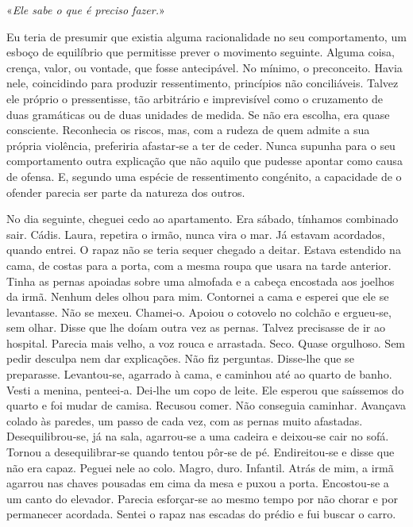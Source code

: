«\emph{Ele sabe o que é preciso fazer.}»

Eu teria de presumir que existia alguma racionalidade no seu
comportamento, um esboço de equilíbrio que permitisse prever o movimento
seguinte. Alguma coisa, crença, valor, ou vontade, que fosse
antecipável. No mínimo, o preconceito. Havia nele, coincidindo para
produzir ressentimento, princípios não conciliáveis. Talvez ele próprio
o pressentisse, tão arbitrário e imprevisível como o cruzamento de duas
gramáticas ou de duas unidades de medida. Se não era escolha, era quase
consciente. Reconhecia os riscos, mas, com a rudeza de quem admite a sua
própria violência, preferiria afastar­‑se a ter de ceder. Nunca supunha
para o seu comportamento outra explicação que não aquilo que pudesse
apontar como causa de ofensa. E, segundo uma espécie de ressentimento
congénito, a capacidade de o ofender parecia ser parte da natureza dos
outros.

No dia seguinte, cheguei cedo ao apartamento. Era sábado, tínhamos
combinado sair. Cádis. Laura, repetira o irmão, nunca vira o mar. Já
estavam acordados, quando entrei. O rapaz não se teria sequer chegado a
deitar. Estava estendido na cama, de costas para a porta, com a mesma
roupa que usara na tarde anterior. Tinha as pernas apoiadas sobre uma
almofada e a cabeça encostada aos joelhos da irmã. Nenhum deles olhou
para mim. Contornei a cama e esperei que ele se levantasse. Não se
mexeu. Chamei­‑o. Apoiou o cotovelo no colchão e ergueu­‑se, sem olhar.
Disse que lhe doíam outra vez as pernas. Talvez precisasse de ir ao
hospital. Parecia mais velho, a voz rouca e arrastada. Seco. Quase
orgulhoso. Sem pedir desculpa nem dar explicações. Não fiz perguntas.
Disse­‑lhe que se preparasse. Levantou­‑se, agarrado à cama, e caminhou
até ao quarto de banho. Vesti a menina, penteei­‑a. Dei­‑lhe um copo de
leite. Ele esperou que saíssemos do quarto e foi mudar de camisa.
Recusou comer. Não conseguia caminhar. Avançava colado às paredes, um
passo de cada vez, com as pernas muito afastadas. Desequilibrou­‑se, já
na sala, agarrou­‑se a uma cadeira e deixou­‑se cair no sofá. Tornou a
desequilibrar­‑se quando tentou pôr­‑se de pé. Endireitou­‑se e disse
que não era capaz. Peguei nele ao colo. Magro, duro. Infantil. Atrás de
mim, a irmã agarrou nas chaves pousadas em cima da mesa e puxou a porta.
Encostou­‑se a um canto do elevador. Parecia esforçar­‑se ao mesmo tempo
por não chorar e por permanecer acordada. Sentei o rapaz nas escadas do
prédio e fui buscar o carro.

